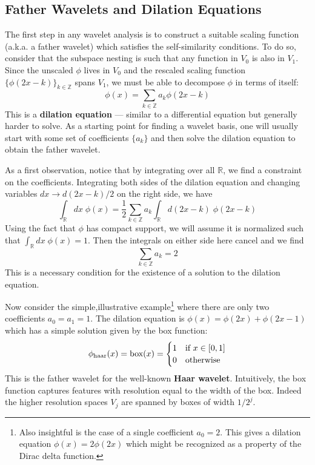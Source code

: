 \documentclass[twocolumn]{gwclass}
\newcommand{\R}{\mathbb{R}}
\newcommand{\Z}{\mathbb{Z}}
\begin{document}
\subsection{Father Wavelets and Dilation Equations}
The first step in any wavelet analysis is to construct a suitable scaling function (a.k.a. a father wavelet) which satisfies the self-similarity conditions. To do so, consider that the subspace nesting is such that any function in $V_0$ is also in $V_1$. Since the unscaled $\phi$ lives in $V_0$ and the rescaled scaling function $\{\phi(2x-k)\}_{k\in\Z}$ spans $V_1$, we must be able to decompose $\phi$ in terms of itself:
$$ \phi(x) = \sum_{k\in\Z} a_k \phi(2x - k) $$
This is a \textbf{dilation equation} --- similar to a differential equation but generally harder to solve. As a starting point for finding a wavelet basis, one will usually start with some set of coefficients $\{a_k\}$ and then solve the dilation equation to obtain the father wavelet.

As a first observation, notice that by integrating over all $\R$, we find a constraint on the coefficients. Integrating both sides of the dilation equation and changing variables $dx\to d(2x-k)/2$ on the right side, we have
$$ \int_\R dx\; \phi(x) = \frac{1}{2}\sum_{k\in\Z} a_k\int_\R d(2x-k)\; \phi(2x-k) $$
Using the fact that $\phi$ has compact support, we will assume it is normalized such that $\int_\R dx\;\phi(x)=1$. Then the integrals on either side here cancel and we find
$$ \sum_{k\in\Z}a_k = 2 $$
This is a necessary condition for the existence of a solution to the dilation equation.

Now consider the simple,illustrative example\footnote{Also insightful is the case of a single coefficient $a_0=2$. This gives a dilation equation $\phi(x)=2\phi(2x)$ which might be recognized as a property of the Dirac delta function.} where there are only two coefficients $a_0=a_1=1$. The dilation equation is $ \phi(x) = \phi(2x) + \phi(2x-1) $ which has a simple solution given by the box function:
$$ \phi_{\text{\normalfont{haar}}}(x)=\text{\normalfont{box}}(x) = \begin{cases}
	1 & \text{\normalfont{if }} x\in [0,1] \\
	0 & \text{\normalfont{otherwise}}
\end{cases} $$
This is the father wavelet for the well-known \textbf{Haar wavelet}. Intuitively, the box function captures features with resolution equal to the width of the box. Indeed the higher resolution spaces $V_j$ are spanned by boxes of width $1/2^j$.
\end{document}
